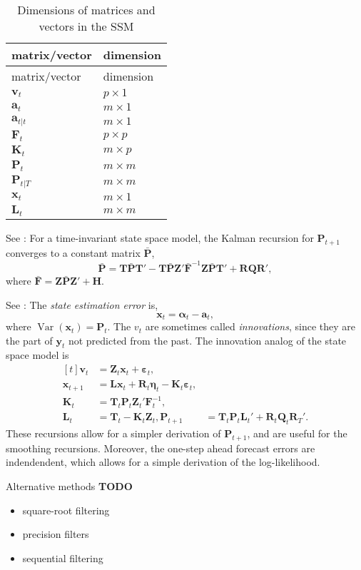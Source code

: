 \documentclass[]{book}
\providecommand{\tightlist}{%
  \setlength{\itemsep}{0pt}\setlength{\parskip}{0pt}}
\DeclareMathOperator{\Var}{Var}
\newcommand{\mat}[1]{\boldsymbol{#1}}
\renewcommand{\vec}[1]{\boldsymbol{#1}}
\renewcommand{\T}{'}
\begin{document}
\begin{longtable}[c]{@{}ll@{}}
\caption{Dimensions of matrices and vectors in the SSM}\tabularnewline
\toprule
matrix/vector & dimension\tabularnewline
\midrule
\endfirsthead
\toprule
matrix/vector & dimension\tabularnewline
\midrule
\endhead
\(\vec{v}_t\) & \(p \times 1\)\tabularnewline
\(\vec{a}_t\) & \(m \times 1\)\tabularnewline
\(\vec{a}_{t|t}\) & \(m \times 1\)\tabularnewline
\(\mat{F}_t\) & \(p \times p\)\tabularnewline
\(\mat{K}_t\) & \(m \times p\)\tabularnewline
\(\mat{P}_t\) & \(m \times m\)\tabularnewline
\(\mat{P}_{t|T}\) & \(m \times m\)\tabularnewline
\(\vec{x}_t\) & \(m \times 1\)\tabularnewline
\(\mat{L}_t\) & \(m \times m\)\tabularnewline
\bottomrule
\end{longtable}

See \autocite[Sec 4.3.4]{DurbinKoopman2012}: For a time-invariant state
space model, the Kalman recursion for \(\mat{P}_{t + 1}\) converges to a
constant matrix \(\bar{\mat{P}}\), \[
\bar{\mat{P}} = \mat{T} \bar{\mat{P}} \mat{T}\T - \mat{T} \bar{\mat{P}} \mat{Z}\T \bar{\mat{F}}^{-1} \mat{Z} \bar{\mat{P}} \mat{T}\T + \mat{R} \mat{Q} \mat{R}\T ,
\] where \(\bar{\mat{F}} = \mat{Z} \bar{\mat{P}} \mat{Z}\T + \mat{H}\).

See \autocite[Sec 4.3.5]{DurbinKoopman2012}: The \emph{state estimation
error} is, \[
\vec{x}_t = \vec{\alpha}_t - \vec{a}_t,
\] where \(\Var(\vec{x}_t) = \mat{P}_t\). The \(v_t\) are sometimes
called \emph{innovations}, since they are the part of \(\vec{y}_t\) not
predicted from the past. The innovation analog of the state space model
is \[
\begin{aligned}[t]
\vec{v}_t &= \mat{Z}_t \vec{x}_t + \vec{\varepsilon}_t ,  \\
\vec{x}_{t + 1} &= \mat{L} \vec{x}_{t} + \mat{R}_t \vec{\eta}_t - \mat{K}_t \vec{\varepsilon}_t , \\
\mat{K}_t &= \mat{T}_t \mat{P}_t \mat{Z}_t\T \mat{F}_t^{-1} , \\
\mat{L}_t &= \mat{T}_t - \mat{K}_t \mat{Z}_t ,
\mat{P}_{t + 1} &= \mat{T}_t \mat{P}_t \mat{L}_t\T +  \mat{R}_t \mat{Q}_t \mat{R}_T\T  .
\end{aligned}
\] These recursions allow for a simpler derivation of
\(\mat{P}_{t + 1}\), and are useful for the smoothing recursions.
Moreover, the one-step ahead forecast errors are indendendent, which
allows for a simple derivation of the log-likelihood.

Alternative methods \textbf{TODO}

\begin{itemize}
\tightlist
\item
  square-root filtering
\item
  precision filters
\item
  sequential filtering
\end{itemize}
\end{document}
